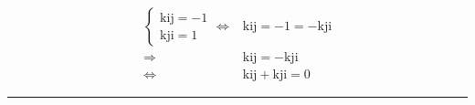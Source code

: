 \documentclass[
]{book}
\theoremstyle{definition}
\theoremstyle{definition}
\theoremstyle{definition}
\theoremstyle{definition}
\theoremstyle{remark}
\begin{document}
\[
\begin{aligned}
\begin{cases}
\mathrm{k}\mathrm{i}\mathrm{j}=-1\\
\mathrm{k}\mathrm{j}\mathrm{i}=1
\end{cases}\Leftrightarrow & \mathrm{k}\mathrm{i}\mathrm{j}=-1=-\mathrm{k}\mathrm{j}\mathrm{i}\\
\Rightarrow & \mathrm{k}\mathrm{i}\mathrm{j}=-\mathrm{k}\mathrm{j}\mathrm{i}\\
\Leftrightarrow & \mathrm{k}\mathrm{i}\mathrm{j}+\mathrm{k}\mathrm{j}\mathrm{i}=0
\end{aligned}
\]

\begin{center}\rule{0.5\linewidth}{0.5pt}\end{center}
\end{document}
